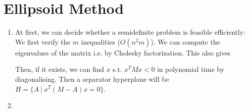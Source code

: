 \documentclass{scrartcl}
\newcommand\1{\mathbf{1}}
\begin{document}
\section{Ellipsoid Method}
\begin{enumerate}
\item
At first, we can decide whether a semidefinite problem is feasible efficiently: We first verify the $m$ inequalities ($O(n^2m)$). We can compute the eigenvalues of the matrix i.e. by Cholesky factorization. This also gives 

Then, if it exists, we can find $x$ s.t. $x^T M x < 0$ in polynomial time by diagonalising. Then a separator hyperplane will be $H = \{A\ |\ x^T (M-A) x = 0\}$.

\item


\end{enumerate}
\end{document}
